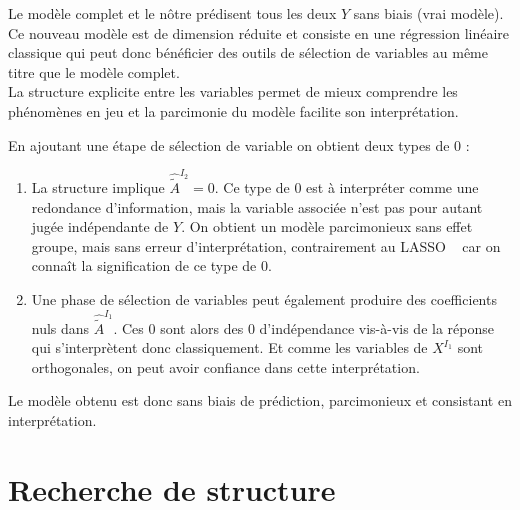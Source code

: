 \documentclass[12pt]{article}
\begin{document}
		Le modèle complet et le nôtre prédisent tous les deux $Y$ sans biais (vrai modèle)\cite{saporta2006probabilites}.
	\\	
	Ce nouveau modèle est de dimension réduite et consiste en une régression linéaire classique qui peut donc bénéficier des outils de sélection de variables au même titre que le modèle complet.			
		 \\		
		 La structure explicite entre les variables permet de mieux comprendre les phénomènes en jeu et la parcimonie du modèle facilite son interprétation.		

		En ajoutant une étape de sélection de variable on obtient deux types de $0$ :
			\begin{enumerate}
			\item La structure implique $\hat{\tilde{A}}^{I_2} = 0 $. Ce type de 0 est à interpréter comme une redondance d'information, mais la variable associée n'est pas pour autant jugée indépendante de $Y$. On obtient un modèle parcimonieux sans effet groupe, mais sans erreur d'interprétation, contrairement au LASSO ~\cite{Zhao2006MSC} car on connaît la signification de ce type de $0$.
			\item Une phase de sélection de variables peut également produire des coefficients nuls dans $\hat{\tilde{A}}^{I_1}$. Ces $0$ sont alors des $0$ d'indépendance vis-à-vis de la réponse qui s'interprètent donc classiquement. Et comme les variables de $X^{I_1}$ sont orthogonales, on peut avoir confiance dans cette interprétation.
			\end{enumerate}
		Le modèle obtenu est donc sans biais de prédiction, parcimonieux et consistant en interprétation.	
\section{Recherche de structure}
	 	
\end{document}
